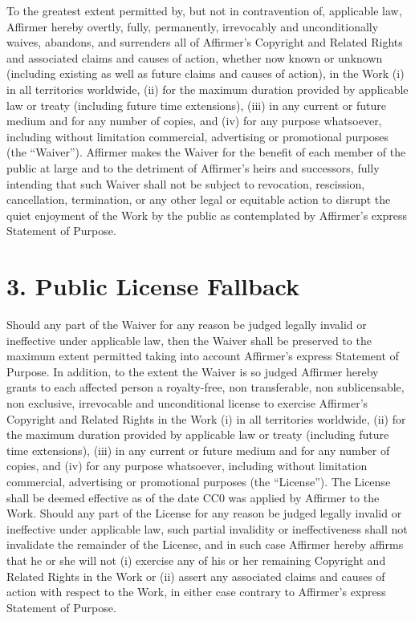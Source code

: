 \documentclass[a4paper,10pt,oneside]{book}
\begin{document}
To the greatest extent permitted by, but not in contravention
of, applicable law, Affirmer hereby overtly, fully, permanently,
irrevocably and unconditionally waives, abandons, and surrenders all of
Affirmer's Copyright and Related Rights and associated claims and causes
of action, whether now known or unknown (including existing as well as
future claims and causes of action), in the Work (i) in all territories
worldwide, (ii) for the maximum duration provided by applicable law or
treaty (including future time extensions), (iii) in any current or future
medium and for any number of copies, and (iv) for any purpose whatsoever,
including without limitation commercial, advertising or promotional
purposes (the ``Waiver''). Affirmer makes the Waiver for the benefit of each
member of the public at large and to the detriment of Affirmer's heirs and
successors, fully intending that such Waiver shall not be subject to
revocation, rescission, cancellation, termination, or any other legal or
equitable action to disrupt the quiet enjoyment of the Work by the public
as contemplated by Affirmer's express Statement of Purpose.

\section*{3. Public License Fallback}

Should any part of the Waiver for any reason
be judged legally invalid or ineffective under applicable law, then the
Waiver shall be preserved to the maximum extent permitted taking into
account Affirmer's express Statement of Purpose. In addition, to the
extent the Waiver is so judged Affirmer hereby grants to each affected
person a royalty-free, non transferable, non sublicensable, non exclusive,
irrevocable and unconditional license to exercise Affirmer's Copyright and
Related Rights in the Work (i) in all territories worldwide, (ii) for the
maximum duration provided by applicable law or treaty (including future
time extensions), (iii) in any current or future medium and for any number
of copies, and (iv) for any purpose whatsoever, including without
limitation commercial, advertising or promotional purposes (the
``License''). The License shall be deemed effective as of the date CC0 was
applied by Affirmer to the Work. Should any part of the License for any
reason be judged legally invalid or ineffective under applicable law, such
partial invalidity or ineffectiveness shall not invalidate the remainder
of the License, and in such case Affirmer hereby affirms that he or she
will not (i) exercise any of his or her remaining Copyright and Related
Rights in the Work or (ii) assert any associated claims and causes of
action with respect to the Work, in either case contrary to Affirmer's
express Statement of Purpose.
\end{document}
